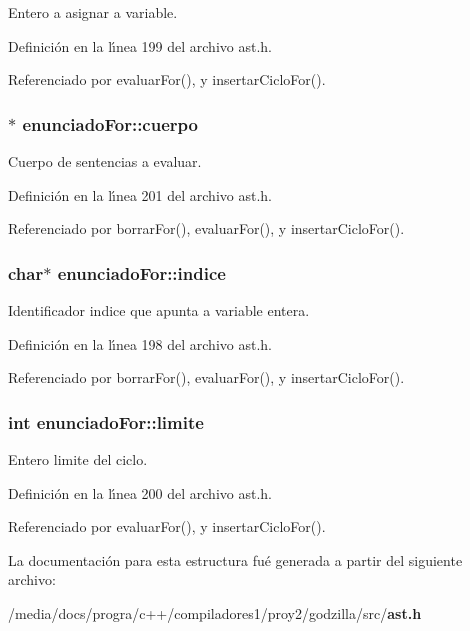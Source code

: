 Entero a asignar a variable. 



Definici\'{o}n en la l\'{\i}nea 199 del archivo ast.h.

Referenciado por evaluar\-For(), y insertar\-Ciclo\-For().
\subsubsection{$\ast$ {\bf enunciado\-For::cuerpo}}\label{structenunciadoFor_o3}


Cuerpo de sentencias a evaluar. 



Definici\'{o}n en la l\'{\i}nea 201 del archivo ast.h.

Referenciado por borrar\-For(), evaluar\-For(), y insertar\-Ciclo\-For().
\subsubsection{\setlength{\rightskip}{0pt plus 5cm}char$\ast$ {\bf enunciado\-For::indice}}\label{structenunciadoFor_o0}


Identificador indice que apunta a variable entera. 



Definici\'{o}n en la l\'{\i}nea 198 del archivo ast.h.

Referenciado por borrar\-For(), evaluar\-For(), y insertar\-Ciclo\-For().
\subsubsection{\setlength{\rightskip}{0pt plus 5cm}int {\bf enunciado\-For::limite}}\label{structenunciadoFor_o2}


Entero limite del ciclo. 



Definici\'{o}n en la l\'{\i}nea 200 del archivo ast.h.

Referenciado por evaluar\-For(), y insertar\-Ciclo\-For().

La documentaci\'{o}n para esta estructura fu\'{e} generada a partir del siguiente archivo:\begin{CompactItemize}
\item 
/media/docs/progra/c++/compiladores1/proy2/godzilla/src/{\bf ast.h}\end{CompactItemize}
